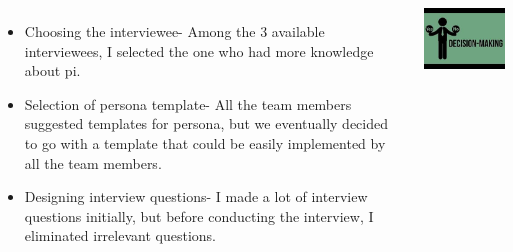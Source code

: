\documentclass[20pt,margin=1in,innermargin=-4.5in,blockverticalspace=-0.25in]{tikzposter}
\begin{document}
\begin{columns}
    {
    \begin{itemize}
        \item Choosing the interviewee- Among the 3 available interviewees, I selected the one who had more knowledge about pi.
        \item Selection of persona template- All the team members suggested templates for persona, but we eventually decided to go with a template that could be easily implemented by all the team members.
        \item Designing interview questions- I made a lot of interview questions initially, but before conducting the interview, I eliminated irrelevant questions.
    \end{itemize}
     \begin{tikzfigure}
            \includegraphics[width=0.4\linewidth]{decision.jpg}
        \end{tikzfigure}
        }
    
\end{columns}
\end{document}
